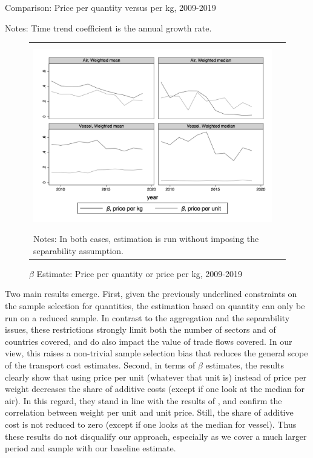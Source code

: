 \documentclass[a4paper,11pt]{article}
\begin{document}
\begin{table}[htbp]
	\caption{Comparison: Price per quantity versus per kg, 2009-2019}
	\begin{center}		
		
%		
{\parbox[l]{12cm}{ \vspace{4pt}\footnotesize{Notes: Time trend coefficient is the annual growth rate.}}}
\end{center}
	\label{tab_comp_wgt_qty}%
\end{table}%

\begin{figure}[htbp]
	\caption{$\beta$ Estimate: Price per quantity or price per kg, 2009-2019}
	\begin{center}
		\begin{tabular}{cc}
			\includegraphics[height=8cm]{../../revised_article/scatter_chronology_non_separe_wgt_non_separe_qy.png}\\
			\multicolumn{2}{l}{{\footnotesize Notes: In both cases, estimation is run without imposing the separability assumption.}}
		\end{tabular}
	\end{center}
		\label{graph_comp_wgt_qty}%
\end{figure}

Two main results emerge. First, given the previously underlined constraints on the sample selection for quantities, the estimation based on quantity can only be run on a reduced sample. In contrast to the aggregation and the separability issues, these restrictions strongly limit both the number of sectors and of countries covered, and do also impact the value of trade flows covered. In our view, this raises a non-trivial sample selection bias that reduces the general scope of the transport cost estimates. Second, in terms of $\beta$ estimates, the results clearly show that using price per unit (whatever that unit is) instead of price per weight decreases the share of additive costs (except if one look at the median for air). In this regard, they stand in line with the results of \cite{Lashkaripour_JIE2020}, and confirm the correlation between weight per unit and unit price. Still, the share of additive cost is not reduced to zero (except if one looks at the median for vessel). Thus these results do not disqualify our approach, especially as we cover a much larger period and sample with our baseline estimate.
\end{document}
